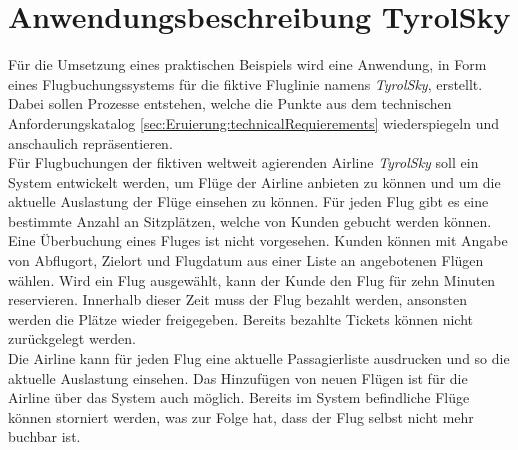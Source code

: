 \section{Anwendungsbeschreibung TyrolSky}
Für die Umsetzung eines praktischen Beispiels wird eine Anwendung, in Form eines Flugbuchungssystems für die fiktive Fluglinie namens \textit{TyrolSky}, erstellt. Dabei sollen Prozesse entstehen, welche die Punkte aus dem technischen Anforderungskatalog \ref{sec:Eruierung:technicalRequierements} wiederspiegeln und anschaulich repräsentieren. \\
Für Flugbuchungen der fiktiven weltweit agierenden Airline \textit{TyrolSky} soll ein System entwickelt werden, um Flüge der Airline anbieten zu können und um die aktuelle Auslastung der Flüge einsehen zu können. Für jeden Flug gibt es eine bestimmte Anzahl an Sitzplätzen, welche von Kunden gebucht werden können. Eine Überbuchung eines Fluges ist nicht vorgesehen. Kunden können mit Angabe von Abflugort, Zielort und Flugdatum aus einer Liste an angebotenen Flügen wählen. Wird ein Flug ausgewählt, kann der Kunde den Flug für zehn Minuten reservieren. Innerhalb dieser Zeit muss der Flug bezahlt werden, ansonsten werden die Plätze wieder freigegeben. Bereits bezahlte Tickets können nicht zurückgelegt werden. \\
Die Airline kann für jeden Flug eine aktuelle Passagierliste ausdrucken und so die aktuelle Auslastung einsehen. Das Hinzufügen von neuen Flügen ist für die Airline über das System auch möglich. Bereits im System befindliche Flüge können storniert werden, was zur Folge hat, dass der Flug selbst nicht mehr buchbar ist. \\

